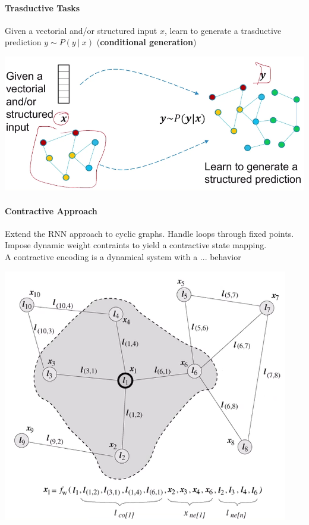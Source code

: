 \documentclass[10pt]{report}
\begin{document}
\paragraph{Trasductive Tasks} Given a vectorial and/or structured input $x$, learn to generate a trasductive prediction $y\sim P(y\:|\:x)$ (\textbf{conditional generation})
\begin{center}
	\includegraphics[scale=0.5]{193.png}
\end{center}
\paragraph{Contractive Approach} Extend the RNN approach to cyclic graphs. Handle loops through fixed points. Impose dynamic weight contraints to yield a contractive state mapping.\\
A contractive encoding is a dynamical system with a ... behavior %
\begin{center}
	\includegraphics[scale=0.5]{194.png}
\end{center}
\end{document}
